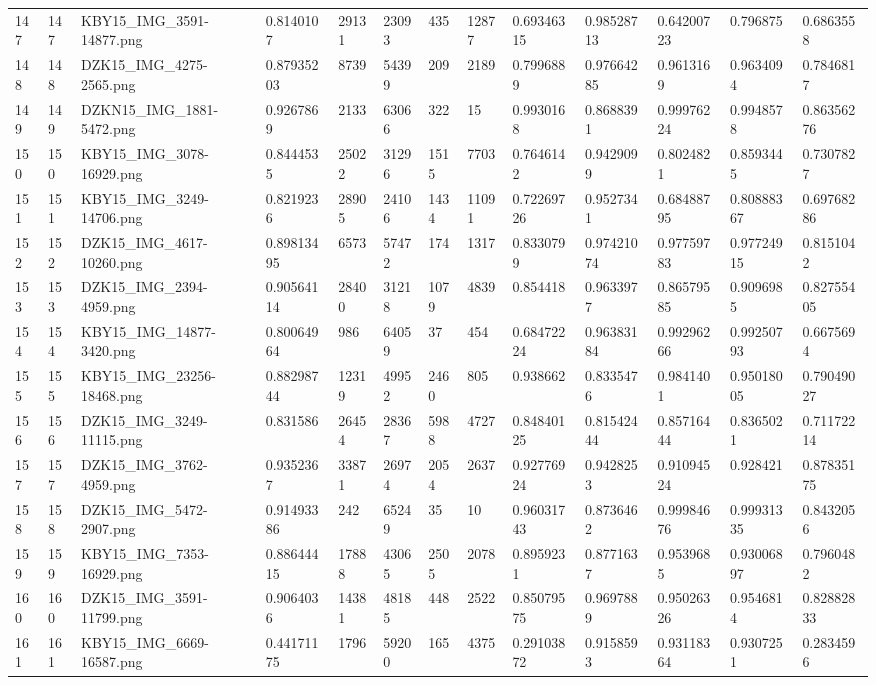 \documentclass[11pt, a4paper, twoside]{report}
\begin{document}
\begin{longtable}[c]{@{}lllllllllllll@{}}
147 & 147 & KBY15\_IMG\_3591-14877.png & 0.8140107 & 29131 & 23093 & 435 & 12877 & 0.69346315 & 0.98528713 & 0.64200723 & 0.796875 & 0.6863558 \\
148 & 148 & DZK15\_IMG\_4275-2565.png & 0.87935203 & 8739 & 54399 & 209 & 2189 & 0.7996889 & 0.97664285 & 0.9613169 & 0.9634094 & 0.7846817 \\
149 & 149 & DZKN15\_IMG\_1881-5472.png & 0.9267869 & 2133 & 63066 & 322 & 15 & 0.9930168 & 0.8688391 & 0.99976224 & 0.9948578 & 0.86356276 \\
150 & 150 & KBY15\_IMG\_3078-16929.png & 0.8444535 & 25022 & 31296 & 1515 & 7703 & 0.7646142 & 0.9429099 & 0.8024821 & 0.8593445 & 0.7307827 \\
151 & 151 & KBY15\_IMG\_3249-14706.png & 0.8219236 & 28905 & 24106 & 1434 & 11091 & 0.72269726 & 0.9527341 & 0.68488795 & 0.80888367 & 0.69768286 \\
152 & 152 & DZK15\_IMG\_4617-10260.png & 0.89813495 & 6573 & 57472 & 174 & 1317 & 0.8330799 & 0.97421074 & 0.97759783 & 0.97724915 & 0.8151042 \\
153 & 153 & DZK15\_IMG\_2394-4959.png & 0.90564114 & 28400 & 31218 & 1079 & 4839 & 0.854418 & 0.9633977 & 0.86579585 & 0.9096985 & 0.82755405 \\
154 & 154 & KBY15\_IMG\_14877-3420.png & 0.80064964 & 986 & 64059 & 37 & 454 & 0.68472224 & 0.96383184 & 0.99296266 & 0.99250793 & 0.6675694 \\
155 & 155 & KBY15\_IMG\_23256-18468.png & 0.88298744 & 12319 & 49952 & 2460 & 805 & 0.938662 & 0.8335476 & 0.9841401 & 0.95018005 & 0.79049027 \\
156 & 156 & DZK15\_IMG\_3249-11115.png & 0.831586 & 26454 & 28367 & 5988 & 4727 & 0.84840125 & 0.81542444 & 0.85716444 & 0.8365021 & 0.71172214 \\
157 & 157 & DZK15\_IMG\_3762-4959.png & 0.9352367 & 33871 & 26974 & 2054 & 2637 & 0.92776924 & 0.9428253 & 0.91094524 & 0.928421 & 0.87835175 \\
158 & 158 & DZK15\_IMG\_5472-2907.png & 0.91493386 & 242 & 65249 & 35 & 10 & 0.96031743 & 0.8736462 & 0.99984676 & 0.99931335 & 0.8432056 \\
159 & 159 & KBY15\_IMG\_7353-16929.png & 0.88644415 & 17888 & 43065 & 2505 & 2078 & 0.8959231 & 0.8771637 & 0.9539685 & 0.93006897 & 0.7960482 \\
160 & 160 & DZK15\_IMG\_3591-11799.png & 0.9064036 & 14381 & 48185 & 448 & 2522 & 0.85079575 & 0.9697889 & 0.95026326 & 0.9546814 & 0.82882833 \\
161 & 161 & KBY15\_IMG\_6669-16587.png & 0.44171175 & 1796 & 59200 & 165 & 4375 & 0.29103872 & 0.9158593 & 0.93118364 & 0.9307251 & 0.2834596 \\

\end{longtable}
\end{document}
